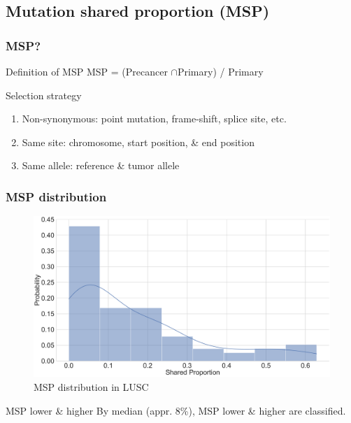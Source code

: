 \documentclass{beamer}
\begin{document}
        \subsection{Mutation shared proportion (MSP)}
            \begin{frame}
                \frametitle{MSP?}

                \begin{block}{Definition of MSP}
                    MSP = (Precancer $\cap$Primary) / Primary
                \end{block}

                \begin{block}{Selection strategy}
                    \begin{enumerate}
                        \item Non-synonymous: point mutation, frame-shift, splice site, etc.
                        \item Same site: chromosome, start position, \& end position
                        \item Same allele: reference \& tumor allele
                    \end{enumerate}
                \end{block}
            \end{frame}

            \begin{frame}
                \frametitle{MSP distribution}

                \begin{figure}
                    \includegraphics[width=0.6 \linewidth]{figures/Mutation_Shared_Proportion/Histogram/BWA.SQC.SharedProportion.pdf}
                    \caption{MSP distribution in LUSC}
                \end{figure}

                \begin{exampleblock}{MSP lower \& higher}
                    By median (appr. 8\%), MSP lower \& higher are classified.
                \end{exampleblock}
            \end{frame}
\end{document}
